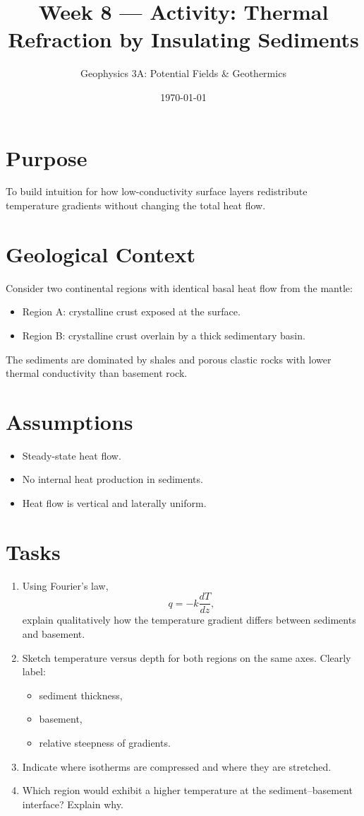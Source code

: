 \documentclass[11pt,a4paper]{article}
\title{Week 8 --- Activity: Thermal Refraction by Insulating Sediments}
\author{Geophysics 3A: Potential Fields \& Geothermics}
\date{\today}
\begin{document}
\maketitle

\section*{Purpose}
To build intuition for how low-conductivity surface layers redistribute
temperature gradients without changing the total heat flow.

\section*{Geological Context}
Consider two continental regions with identical basal heat flow from the mantle:
\begin{itemize}
  \item Region A: crystalline crust exposed at the surface.
  \item Region B: crystalline crust overlain by a thick sedimentary basin.
\end{itemize}

The sediments are dominated by shales and porous clastic rocks with lower
thermal conductivity than basement rock.

\section*{Assumptions}
\begin{itemize}
  \item Steady-state heat flow.
  \item No internal heat production in sediments.
  \item Heat flow is vertical and laterally uniform.
\end{itemize}

\section*{Tasks}
\begin{enumerate}
  \item Using Fourier's law,
  \[
    q = -k \frac{dT}{dz},
  \]
  explain qualitatively how the temperature gradient differs between
  sediments and basement.
  
  \item Sketch temperature versus depth for both regions on the same axes.
  Clearly label:
  \begin{itemize}
    \item sediment thickness,
    \item basement,
    \item relative steepness of gradients.
  \end{itemize}

  \item Indicate where isotherms are compressed and where they are stretched.

  \item Which region would exhibit a higher temperature at the sediment--basement
  interface? Explain why.
\end{enumerate}
\end{document}
